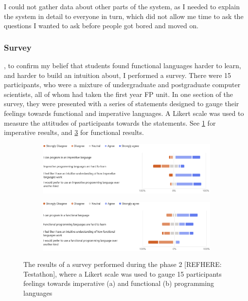 I could not gather data about other parts of the system, as I needed to explain the system in detail to everyone in turn, which did not allow me time to ask the questions I wanted to ask before people got bored and moved on. 

\subsubsection{Survey}
, to confirm my belief that students found functional languages harder to learn, and harder to build an intuition about, I performed a survey. There were 15 participants, who were a mixture of undergraduate and postgraduate computer scientists, all of whom had taken the first year \ac{FP} unit. In one section of the survey, they were presented with a series of statements designed to gauge their feelings towards functional and imperative languages. A Likert scale\cite{likert1932technique} was used to measure the attitudes of participants towards the statements. See \ref{fig:imp_is_easy} for imperative results, and \ref{fig:fp_is_hard} for functional results. 

\begin{figure}[ht]
    \begin{subfigure}{\textwidth}
        \centering
        \includegraphics[width=\linewidth]{images/imperative_likert.png}
        \caption{}
        \label{fig:imp_is_easy}
    \end{subfigure}
    
    \begin{subfigure}{\textwidth}
        \centering
        \includegraphics[width=\linewidth]{images/fp_likert.png}
        \caption{}
        \label{fig:fp_is_hard}
    \end{subfigure}
    \caption{The results of a survey performed during the phase 2 [REFHERE: Testathon], where a Likert scale was used to gauge 15 participants feelings towards imperative (a) and functional (b) programming languages}
\end{figure}

